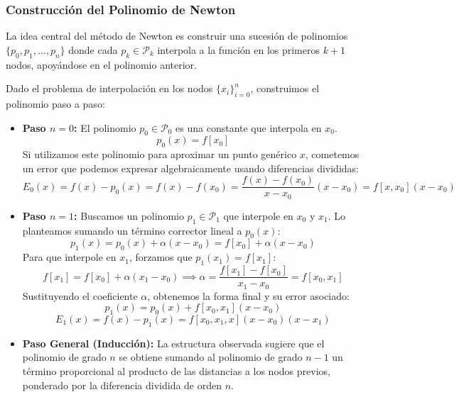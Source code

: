 \subsubsection{Construcción del Polinomio de Newton}

La idea central del método de Newton es construir una sucesión de polinomios $\{p_0, p_1, \dots, p_n\}$ donde cada $p_k \in \mathcal{P}_k$ interpola a la función en los primeros $k+1$ nodos, apoyándose en el polinomio anterior.

\begin{definición}
    Dado el problema de interpolación en los nodos $\{ x_i \}_{i=0}^n$, construimos el polinomio paso a paso:
    \begin{itemize}
        \item \textbf{Paso $n = 0$:} El polinomio $p_0 \in \mathcal{P}_0$ es una constante que interpola en $x_0$.
        \[
            p_0(x) = f[x_0]
        \]
        Si utilizamos este polinomio para aproximar un punto genérico $x$, cometemos un error que podemos expresar algebraicamente usando diferencias divididas:
        \[
            E_0(x) = f(x) - p_0(x) = f(x) - f(x_0) = \frac{f(x) - f(x_0)}{x - x_0} (x - x_0) = f[x, x_0] (x - x_0)
        \]
        \item \textbf{Paso $n = 1$:} Buscamos un polinomio $p_1 \in \mathcal{P}_1$ que interpole en $x_0$ y $x_1$. Lo planteamos sumando un término corrector lineal a $p_0(x)$:
        \[
            p_1(x) = p_0(x) + \alpha (x - x_0) = f[x_0] + \alpha (x - x_0)
        \]
        Para que interpole en $x_1$, forzamos que $p_1(x_1) = f[x_1]$:
        \[
            f[x_1] = f[x_0] + \alpha (x_1 - x_0) \implies \alpha = \frac{f[x_1] - f[x_0]}{x_1 - x_0} = f[x_0, x_1]
        \]
        Sustituyendo el coeficiente $\alpha$, obtenemos la forma final y su error asociado:
        \[
            p_1(x) = p_0(x) + f[x_0, x_1](x - x_0)
        \]
        \[
            E_1(x) = f(x) - p_1(x) = f[x_0, x_1, x] (x - x_0)(x - x_1)
        \]
        \item \textbf{Paso General (Inducción):} La estructura observada sugiere que el polinomio de grado $n$ se obtiene sumando al polinomio de grado $n-1$ un término proporcional al producto de las distancias a los nodos previos, ponderado por la diferencia dividida de orden $n$.
    \end{itemize}
\end{definición}

